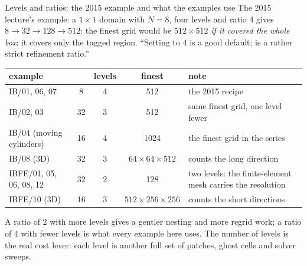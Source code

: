 \documentclass[aspectratio=169,11pt]{beamer}
\begin{document}
\begin{frame}{Levels and ratios: the 2015 example and what the examples use}
\label{fr:levels2}
\small The 2015 lecture's example: a $1 \times 1$ domain with $N = 8$, four levels and ratio 4 gives $8 \to 32 \to 128 \to 512$: the finest grid would be $512 \times 512$ \emph{if it covered the whole box}; it covers only the tagged region. ``Setting  to 4 is a good default;  is a rather strict refinement ratio.''
\vspace{1mm}

\scriptsize
\begin{tabular}{@{}L{0.3\textwidth}cccL{0.3\textwidth}@{}}
\toprule
example &  & levels & finest & note\\
\midrule
IB/01, 06, 07 & 8 & 4 & 512 & the 2015 recipe\\
IB/02, 03 & 32 & 3 & 512 & same finest grid, one level fewer\\
IB/04 (moving cylinders) & 16 & 4 & 1024 & the finest grid in the series\\
IB/08 (3D) & 32 & 3 & $64 \times 64 \times 512$ &  counts the long direction\\
IBFE/01, 05, 06, 08, 12 & 32 & 2 & 128 & two levels: the finite-element mesh carries the resolution\\
IBFE/10 (3D) & 16 & 3 & $512 \times 256 \times 256$ &  counts the short directions\\
\bottomrule
\end{tabular}

\vspace{2mm}

\small A ratio of 2 with more levels gives a gentler nesting and more regrid work; a ratio of 4 with fewer levels is what every example here uses. The number of levels is the real cost lever: each level is another full set of patches, ghost cells and solver sweeps.
\end{frame}
\end{document}
